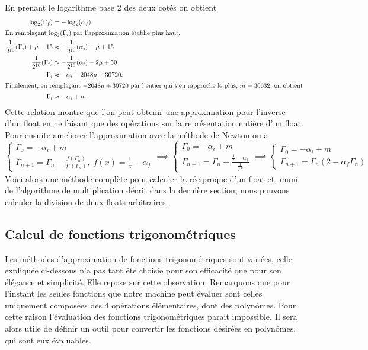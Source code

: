 \documentclass{article}
\begin{document}
En prenant le logarithme base 2 des deux cotés on obtient
\begin{align*}
    \log_2(\Gamma_f) &= -\log_2(\alpha_f)\\
    \intertext{En remplaçant $\log_2(\Gamma_i)$ par l'approximation établie plus haut,}
    \frac{1}{2^{10}}(\Gamma_i)+\mu-15 &\approx -\frac{1}{2^{10}}(\alpha_i)-\mu+15\\
    \frac{1}{2^{10}}(\Gamma_i) &\approx -\frac{1}{2^{10}}(\alpha_i)-2\mu+30\\
    \Gamma_i &\approx -\alpha_i-2048\mu+30720.\\
    \intertext{Finalement, en remplaçant $-2048\mu+30720$ par l'entier qui s'en rapproche le plus, $m = 30632$, on obtient}
    \Gamma_i &\approx -\alpha_i+m.
\end{align*}
Cette relation montre que l'on peut obtenir une approximation pour l'inverse d'un float en ne faisant que des opérations sur la représentation entière d'un float.
Pour ensuite ameliorer l'approximation avec la méthode de Newton on a
$$\begin{cases}
\Gamma_0 = -\alpha_i + m\\
\Gamma_{n+1} = \Gamma_n-\frac{f(\Gamma_n)}{f'(\Gamma_n)},\; f(x) = \frac{1}{x}-\alpha_f
\end{cases}
\implies
\begin{cases}
\Gamma_0 = -\alpha_i + m\\
\Gamma_{n+1} = \Gamma_n-\frac{\frac{1}{\Gamma}-\alpha_f}{\frac{1}{\Gamma^2}}
\end{cases}
\implies
\begin{cases}
\Gamma_0 = -\alpha_i + m\\
\Gamma_{n+1} = \Gamma_n(2-\alpha_f \Gamma_n)
\end{cases}
$$
Voici alors une méthode complète pour calculer la réciproque d'un float et, muni de l'algorithme de multiplication décrit dans la dernière section, nous pouvons calculer la division de deux floats arbitraires.

\subsection{Calcul de fonctions trigonométriques}
Les méthodes d'approximation de fonctions trigonométriques sont variées, celle expliquée ci-dessous n'a pas tant été choisie pour son efficacité que pour son élégance et simplicité. Elle repose sur cette observation:
Remarquons que pour l'instant les seules fonctions que notre machine peut évaluer sont celles uniquement composées des 4 opérations élémentaires, dont des polynômes. Pour cette raison l'évaluation des fonctions trigonométriques parait impossible. Il sera alors utile de définir un outil pour convertir les fonctions désirées en polynômes, qui sont eux évaluables.
\end{document}
